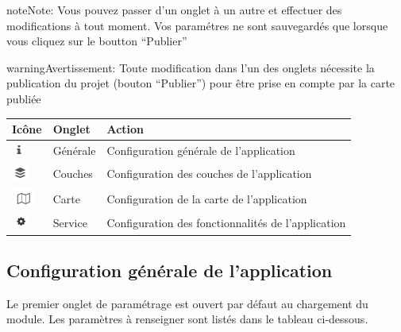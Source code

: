 \documentclass[letterpaper,10pt,french]{sphinxmanual}
\begin{document}
\begin{notice}{note}{Note:}
Vous pouvez passer d'un onglet à un autre et effectuer des
modifications à tout moment. Vos paramétres ne sont sauvegardés que
lorsque vous cliquez sur le boutton ``Publier''
\end{notice}

\begin{notice}{warning}{Avertissement:}
Toute modification dans l'un des onglets nécessite la publication du projet (bouton ``Publier'') pour être prise en compte par la carte publiée
\end{notice}

\begin{tabulary}{\linewidth}{|L|L|L|}
\hline

\textbf{Icône}
 & 
\textbf{Onglet}
 & 
\textbf{Action}
\\
\hline
\includegraphics{info.png}
 & 
Générale
 & 
Configuration générale de l'application
\\
\hline
\includegraphics{layers.png}
 & 
Couches
 & 
Configuration des couches de l'application
\\
\hline
\includegraphics{map.png}
 & 
Carte
 & 
Configuration de la carte de l'application
\\
\hline
\includegraphics{process.png}
 & 
Service
 & 
Configuration des fonctionnalités de l'application
\\
\hline\end{tabulary}



\subsection{Configuration générale de l'application}
\label{apps/appconfig:configuration-generale-de-l-application}
Le premier onglet de paramétrage est ouvert par défaut au chargement
du module. Les paramètres  à renseigner sont listés dans le  tableau
ci-dessous.
\end{document}
